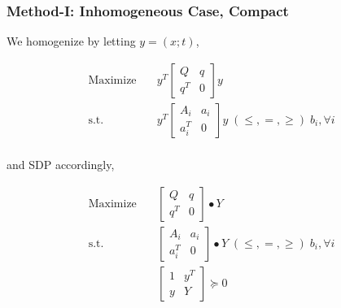 \begin{frame}
  \frametitle{Method-I: Inhomogeneous Case, Compact}
  We homogenize by letting \(y = (x; t)\),

  \begin{equation}\label{eq:sdp_compact}
    \begin{aligned}
      \mathrm{Maximize}\quad & y^T
      \begin{bmatrix} Q   & q \\ q^T & 0 \end{bmatrix}y                                                                   \\
      \mathrm{s.t.} \quad    & y^T  \begin{bmatrix} A_i   & a_i \\ a_i^T & 0 \end{bmatrix}y  \; (\le, =, \ge) \; b_i, \forall i \\
    \end{aligned}
  \end{equation}

  and SDP accordingly,

  \begin{equation}
    \begin{aligned}
      \mathrm{Maximize}\quad & \begin{bmatrix} Q   & q \\ q^T & 0 \end{bmatrix} \bullet Y                                     \\
      \mathrm{s.t.} \quad    & \begin{bmatrix} A_i   & a_i \\ a_i^T & 0 \end{bmatrix} \bullet Y  \; (\le, =, \ge) \; b_i, \forall i \\
                             & \begin{bmatrix} 1 & y^{T} \\ y & Y \end{bmatrix} \succeq 0
    \end{aligned}
  \end{equation}

\end{frame}

